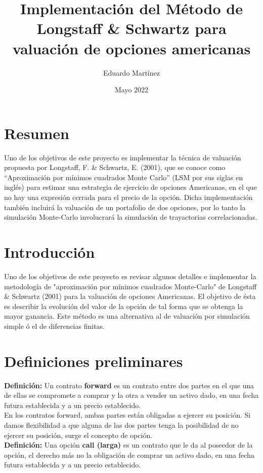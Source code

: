 \documentclass[11pt]{article}
\title{Implementación del Método de Longstaff \& Schwartz para valuación de opciones americanas}
\author{Eduardo Martínez}
\date{Mayo 2022}
\begin{document}
\maketitle

\section{Resumen}

Uno de los objetivos de este proyecto es implementar la técnica de valuación  propuesta por Longstaff, F. \& Schwartz, E. (2001), que se conoce como 
``Aproximación por mínimos cuadrados Monte Carlo'' (LSM por sus siglas en inglés) para estimar una estrategia de ejercicio de opciones Americanas, en el que no hay una expresión cerrada para el precio de la opción. Dicha implementación también incluirá la valuación de un portafolio de dos opciones, por lo tanto la simulación Monte-Carlo involucrará la simulación de trayactorias correlacionadas.


\section{Introducción}

Uno de los objetivos de este proyecto es revisar algunos detalles e implementar la metodología de "aproximación por mínimos cuadrados Monte-Carlo" de Longstaff \& Schwartz (2001) para la valuación de opciones Americanas. El objetivo de ésta 
es describir la evolución del valor de la opción de tal forma que se obtenga la mayor ganancia. Este método es una alternativa al de valuación por simulación 
simple ó el de diferencias finitas.

\section{Definiciones preliminares}
	
\textbf{Definición:}
Un contrato \textbf{forward} es un contrato entre dos partes en el que una  de ellas se compromete a comprar y la otra a vender un activo dado, en una fecha 
futura establecida y a un precio establecido.\\

En los contratos forward, ambas partes están obligadas a ejercer su posición. Si damos flexibilidad a que alguna de las dos partes tenga la posibilidad de no ejercer su posición, surge el concepto de opción.\\
	
\textbf{Definición:}
Una opción \textbf{call (larga)} es un contrato que le da al poseedor de la opción, el derecho más no la obligación de comprar un activo dado, en una fecha 
futura establecida y a un precio establecido.\\
	
\end{document}
